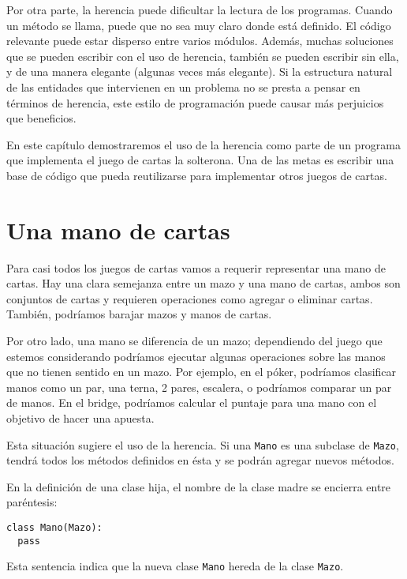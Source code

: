 Por otra parte, la herencia puede dificultar la lectura de los programas.
Cuando un método se llama, puede que no sea muy claro donde está 
definido. El código relevante puede estar disperso entre varios módulos.
Además, muchas soluciones que se pueden escribir con el uso de herencia,
también se pueden escribir sin ella, y de una manera elegante (algunas
veces más elegante). Si la estructura natural de las entidades que
intervienen en un problema no se presta a pensar en términos de 
herencia, este estilo de programación puede causar más 
perjuicios que beneficios.

En este capítulo demostraremos el uso de la herencia como parte de 
un programa que implementa el juego de cartas la solterona. Una de las
metas es escribir una base de código que pueda reutilizarse para
implementar otros juegos de cartas.

\section{Una mano de cartas}

Para casi todos los juegos de cartas vamos a requerir representar
una mano de cartas. Hay una clara semejanza entre un mazo y una
mano de cartas, ambos son conjuntos de cartas y requieren 
operaciones como agregar o eliminar cartas. También, podríamos
barajar mazos y manos de cartas.

Por otro lado, una mano se diferencia de un mazo; dependiendo del 
juego que estemos considerando podríamos ejecutar algunas operaciones
sobre las manos que no tienen sentido en un mazo. Por ejemplo, en 
el póker, podríamos clasificar manos como un par, una terna, 2 pares,
escalera, o podríamos comparar un par de manos. En el bridge, 
podríamos calcular el puntaje para una mano con el objetivo de
hacer una apuesta.

Esta situación sugiere el uso de la herencia. Si una \texttt{Mano} es
una subclase de \texttt{Mazo}, tendrá todos los métodos definidos en 
ésta y se podrán agregar nuevos métodos.


En la definición de una clase hija, el nombre de la clase madre
se encierra entre paréntesis:

\beforeverb
\begin{verbatim}
class Mano(Mazo):
  pass
\end{verbatim}
\afterverb
%
Esta sentencia indica que la nueva clase \texttt{Mano} hereda de la
clase \texttt{Mazo}.

